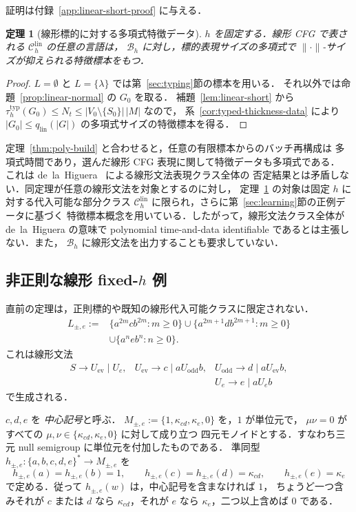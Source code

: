 \documentclass[11pt,a4paper]{ltjsarticle}
\newtheorem{theorem}{定理}[section]
\theoremstyle{remark}
\theoremstyle{plain}
\newcommand{\lin}{\mathrm{lin}}
\newcommand{\Clin}[1]{\mathcal C_{#1}^{\lin}}
\begin{document}
証明は付録~\ref{app:linear-short-proof} に与える．

\begin{theorem}[線形標的に対する多項式特徴データ]
\label{thm:linear-poly}
$h$ を固定する．線形 CFG で表される $\Clin{h}$ の任意の言語は，
$\mathcal B_h$ に対し，標的表現サイズの多項式で
$\|\cdot\|$-サイズが抑えられる特徴標本をもつ．
\end{theorem}
\begin{proof}
$L=\emptyset$ と $L=\{\lambda\}$ では第~\ref{sec:typing}節の標本を用いる．
それ以外では命題~\ref{prop:linear-normal} の $G_0$ を取る．
補題~\ref{lem:linear-short} から
$\tau_h^{\mathrm{typ}}(G_0)\le N_t\le
|V_0\setminus\{S_0\}|\,|M|$ なので，
系~\ref{cor:typed-thickness-data} により
$|G_0|\le q_{\mathrm{lin}}(|G|)$ の多項式サイズの特徴標本を得る．
\end{proof}

定理~\ref{thm:poly-build} と合わせると，任意の有限標本からのバッチ再構成は
多項式時間であり，選んだ線形 CFG 表現に関して特徴データも多項式である．
これは de~la~Higuera~\cite[Theorem~2]{higuera1997} による線形文法表現クラス全体の
否定結果とは矛盾しない．同定理が任意の線形文法を対象とするのに対し，
定理~\ref{thm:linear-poly} の対象は固定 $h$ に対する代入可能な部分クラス
$\Clin{h}$ に限られ，さらに第~\ref{sec:learning}節の正例データに基づく
特徴標本概念を用いている．したがって，線形文法クラス全体が de~la~Higuera の意味で
polynomial time-and-data identifiable であるとは主張しない．また，
$\mathcal B_h$ に線形文法を出力することも要求していない．

\subsection{非正則な線形 \texorpdfstring{fixed-$h$}{fixed-h} 例}

直前の定理は，正則標的や既知の線形代入可能クラスに限定されない．
\[
\begin{split}
L_{\pm,e}:={}&
\{a^{2m}cb^{2m}:m\ge0\}
\cup
\{a^{2m+1}db^{2m+1}:m\ge0\}\\
&\cup
\{a^neb^n:n\ge0\}.
\end{split}
\]
これは線形文法
\[
\begin{array}{lll}
S\to U_{\mathrm{ev}}\mid U_e, &
U_{\mathrm{ev}}\to c\mid aU_{\mathrm{odd}}b, &
U_{\mathrm{odd}}\to d\mid aU_{\mathrm{ev}}b,\\[1mm]
&&U_e\to e\mid aU_eb
\end{array}
\]
で生成される．

$c,d,e$ を \emph{中心記号}と呼ぶ．
$M_{\pm,e}:=\{1,\kappa_{cd},\kappa_e,0\}$ を，$1$ が単位元で，
$\mu\nu=0$ がすべての $\mu,\nu\in\{\kappa_{cd},\kappa_e,0\}$ に対して成り立つ
四元モノイドとする．すなわち三元 null semigroup に単位元を付加したものである．
準同型 $h_{\pm,e}:\{a,b,c,d,e\}^*\to M_{\pm,e}$ を
\begin{equation}\label{eq:lpm-h}
 h_{\pm,e}(a)=h_{\pm,e}(b)=1,\qquad
 h_{\pm,e}(c)=h_{\pm,e}(d)=\kappa_{cd},\qquad
 h_{\pm,e}(e)=\kappa_e
\end{equation}
で定める．従って $h_{\pm,e}(w)$ は，中心記号を含まなければ $1$，
ちょうど一つ含みそれが $c$ または $d$ なら $\kappa_{cd}$，それが $e$ なら
$\kappa_e$，二つ以上含めば $0$ である．
\end{document}
